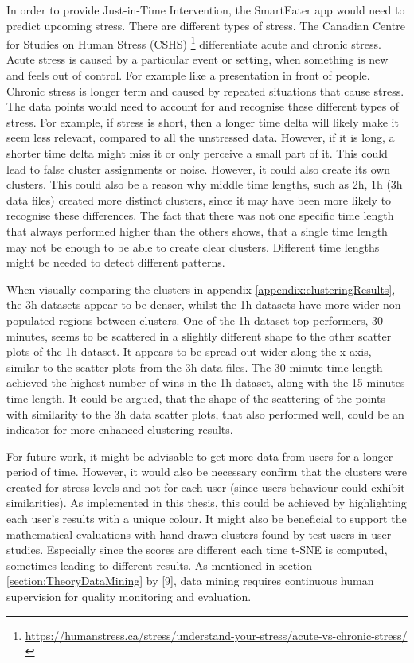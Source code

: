 In order to provide Just-in-Time Intervention, the SmartEater app would need to predict upcoming stress. There are different types of stress. The Canadian Centre for Studies on Human Stress (CSHS) \footnote{\url{https://humanstress.ca/stress/understand-your-stress/acute-vs-chronic-stress/}} differentiate acute and chronic stress. Acute stress is caused by a particular event or setting, when something is new and feels out of control. For example like a presentation in front of people. Chronic stress is longer term and caused by repeated situations that cause stress. The data points would need to account for and recognise these different types of stress. For example, if stress is short, then a longer time delta will likely make it seem less relevant, compared to all the unstressed data. However, if it is long, a shorter time delta might miss it or only perceive a small part of it. This could lead to false cluster assignments or noise. However, it could also create its own clusters. This could also be a reason why middle time lengths, such as 2h, 1h (3h data files) created more distinct clusters, since it may have been more likely to recognise these differences. The fact that there was not one specific time length that always performed higher than the others shows, that a single time length may not be enough to be able to create clear clusters. Different time lengths might be needed to detect different patterns.

When visually comparing the clusters in appendix \ref{appendix:clusteringResults}, the 3h datasets appear to be denser, whilst the 1h datasets have more wider non-populated regions between clusters. One of the 1h dataset top performers, 30 minutes, seems to be scattered in a slightly different shape to the other scatter plots of the 1h dataset. It appears to be spread out wider along the x axis, similar to the scatter plots from the 3h data files. The 30 minute time length achieved the highest number of wins in the 1h dataset, along with the 15 minutes time length. It could be argued, that the shape of the scattering of the points with similarity to the 3h data scatter plots, that also performed well, could be an indicator for more enhanced clustering results.


For future work, it might be advisable to get more data from users for a longer period of time. However, it would also be necessary confirm that the clusters were created for stress levels and not for each user (since users behaviour could exhibit similarities). As implemented in this thesis, this could be achieved by highlighting each user's results with a unique colour. It might also be beneficial to support the mathematical evaluations with hand drawn clusters found by test users in user studies. Especially since the scores are different each time t-SNE is computed, sometimes leading to different results. As mentioned in section \ref{section:TheoryDataMining} by \textcite{DataMiningAndPredictiveAnalytics}[9], data mining requires continuous human supervision for quality monitoring and evaluation.


